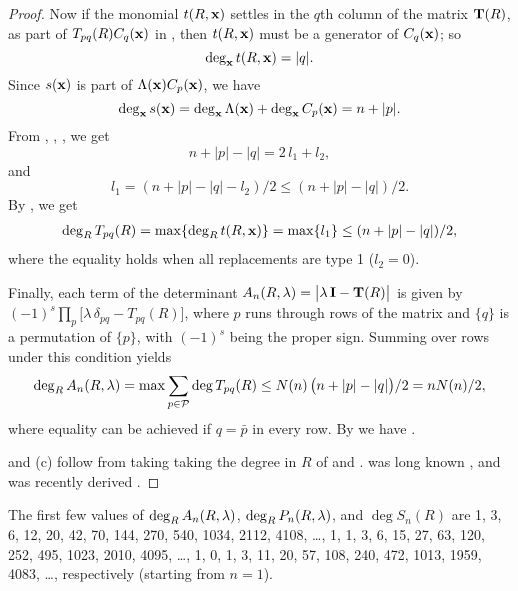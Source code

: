 \documentclass{ws-ijbc}
\begin{document}
\begin{proof}
%
Now if the monomial $t(R, \mathbf{x})$ settles in the $q$th column of
  the matrix $\mathbf{T}(R)$, as part
  of $T_{pq}(R) C_q(\mathbf{x})$ in ,
then
  $t(R, \mathbf{x})$
  must be
  a generator of $C_q(\mathbf{x})$;
so
%
\begin{equation}
  \deg_{\mathbf{x}} t(R, \mathbf{x}) = |q|.
\label{eq:degxt}
\end{equation}
%
Since $s(\mathbf{x})$ is part of $\Lambda(\mathbf{x}) C_p(\mathbf{x})$,
  we have
%
\begin{equation}
  \deg_{\mathbf{x}} s(\mathbf{x}) = \deg_{\mathbf{x}} \Lambda(\mathbf{x}) + \deg_{\mathbf{x}} C_p(\mathbf{x})
  = n + |p|.
\label{eq:degxs}
\end{equation}
%
%
From , , , we get
\[
  n + |p| - |q| = 2 \, l_1 + l_2,
\]
and
\begin{equation}
  l_1  =    (n + |p| - |q| - l_2)/2
             \le  (n + |p| - |q|)/2.
\label{eq:l1limit}
\end{equation}
By , we get
\begin{align*}
  \deg_R T_{pq}(R)
  = \max\{ \deg_R t(R, \mathbf{x}) \}
  = \max\{ l_1 \}
  \le   (n + |p| - |q|)/2,
\end{align*}
where the equality holds when all replacements are type 1 ($l_2 = 0$).


Finally, each term of the determinant
$A_n(R, \lambda) = \big|\lambda \, \mathbf{I} - \mathbf{T}(R)\big|$
is given by
$(-1)^s \prod_{p} \big[\lambda \, \delta_{p q} - T_{pq}(R)\big]$,
where $p$ runs through rows of the matrix
  and $\{q\}$ is a permutation of $\{p\}$,
  with $(-1)^s$ being the proper sign.
Summing over rows under this condition yields
\begin{align*}
  \deg_R A_n(R, \lambda)
  = \max \sum_{p \in \mathcal P} \deg T_{pq}(R)
  \le N(n) \, \big(n + |p| - |q|\big)/2 = n N(n)/2,
\end{align*}
where equality can be achieved if $q = \bar p$ in every row.
By  we have .



 and (c) follow from taking taking the degree in $R$ of
   and .
 was long known \cite{mira, stephenson2},
and  was recently derived \cite{blackhurst}.
%
\end{proof}
%
The first few values of $\deg_R A_n(R, \lambda)$,
  $\deg_R P_n(R, \lambda)$,
  and $\deg S_n(R)$ are
  1, 3, 6, 12, 20, 42, 70, 144, 270, 540, 1034, 2112, 4108, \dots,
  1, 1, 3, 6, 15, 27, 63, 120, 252, 495, 1023, 2010, 4095, \dots,
  1, 0, 1, 3, 11, 20, 57, 108, 240, 472, 1013, 1959, 4083, \dots,
  respectively (starting from $n = 1$).
\end{document}
